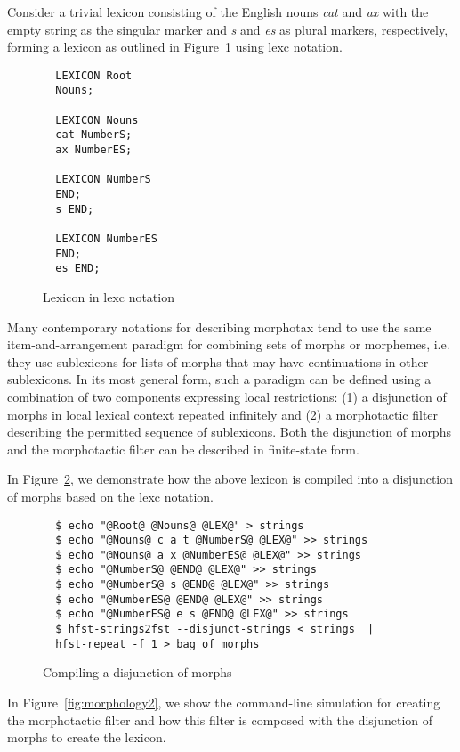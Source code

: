 \documentclass{llncs}
\begin{document}
Consider a trivial lexicon consisting of the English nouns \emph{cat} and \emph{ax} with
the empty string as the singular marker and \emph{s} and \emph{es} as plural markers, respectively,  
forming a lexicon as outlined in Figure~\ref{fig:morph0} using lexc notation.

\begin{figure} [h]
\begin{verbatim}
  LEXICON Root
  Nouns;

  LEXICON Nouns
  cat NumberS;
  ax NumberES;

  LEXICON NumberS
  END;
  s END;

  LEXICON NumberES
  END;
  es END;
\end{verbatim}
\caption{Lexicon in lexc notation}
\label{fig:morph0}
\end{figure}

Many contemporary notations for describing morphotax tend to use the same item-and-arrangement paradigm for
combining sets of morphs or morphemes, i.e. they use sublexicons for lists of morphs that may 
have continuations in other sublexicons. 
In its most general form, such a paradigm can be defined using a combination of two components expressing local restrictions:
(1) a disjunction of morphs in local lexical context repeated infinitely and 
(2) a morphotactic filter describing the permitted sequence of sublexicons.
Both the disjunction of morphs and the morphotactic filter can be described in finite-state form.

In Figure~\ref{fig:morphology1}, we demonstrate how the above lexicon is compiled into a disjunction of 
morphs based on the lexc notation.

\begin{figure} [h]
\begin{verbatim}
  $ echo "@Root@ @Nouns@ @LEX@" > strings
  $ echo "@Nouns@ c a t @NumberS@ @LEX@" >> strings
  $ echo "@Nouns@ a x @NumberES@ @LEX@" >> strings
  $ echo "@NumberS@ @END@ @LEX@" >> strings
  $ echo "@NumberS@ s @END@ @LEX@" >> strings
  $ echo "@NumberES@ @END@ @LEX@" >> strings
  $ echo "@NumberES@ e s @END@ @LEX@" >> strings
  $ hfst-strings2fst --disjunct-strings < strings  | 
  hfst-repeat -f 1 > bag_of_morphs
\end{verbatim}
\caption{Compiling a disjunction of morphs}
\label{fig:morphology1}
\end{figure}

In Figure~\ref{fig:morphology2}, we show the command-line simulation for creating the morphotactic filter and how this filter is composed with the disjunction of morphs to create the lexicon. 
\end{document}
